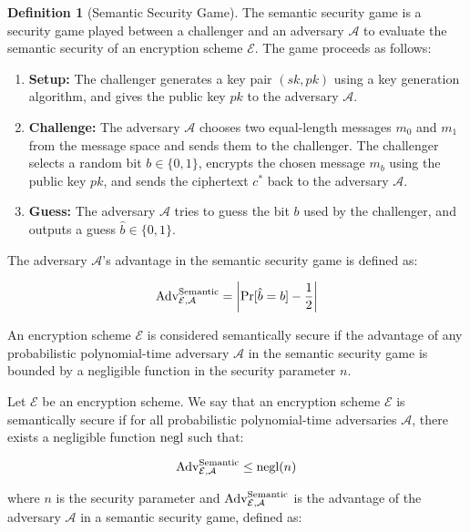\documentclass[12pt,openany]{book}
\theoremstyle{definition}
\newtheorem{definition}{Definition}[chapter]
\newcommand{\A}{\mathcal{A}}
\newcommand{\E}{\mathcal{E}}
\newcommand{\Adv}{\textnormal{Adv}}
\newcommand{\negl}{\textnormal{negl}}
\begin{document}
	\begin{definition}[Semantic Security Game]
		The semantic security game is a security game played between a challenger and an adversary $\A$ to evaluate the semantic security of an encryption scheme $\E$. The game proceeds as follows:
		
		\begin{enumerate}[label=\textbf{Stage \arabic*:}]
			\item \textbf{Setup:}
			The challenger generates a key pair $(sk, pk)$ using a key generation algorithm, and gives the public key $pk$ to the adversary $\A$.
			
			\item \textbf{Challenge:}
			The adversary $\A$ chooses two equal-length messages $m_0$ and $m_1$ from the message space and sends them to the challenger. The challenger selects a random bit $b \in \{0, 1\}$, encrypts the chosen message $m_b$ using the public key $pk$, and sends the ciphertext $c^*$ back to the adversary $\A$.
			
			\item \textbf{Guess:}
			The adversary $\A$ tries to guess the bit $b$ used by the challenger, and outputs a guess $\hat{b} \in \{0, 1\}$.
		\end{enumerate}
		
		The adversary $\A$'s advantage in the semantic security game is defined as:
		
		\begin{align*}
		\Adv_{\E, \A}^{\text{Semantic}} = \left| \Pr[\hat{b} = b] - \frac{1}{2} \right|
		\end{align*}
		
		An encryption scheme $\E$ is considered semantically secure if the advantage of any probabilistic polynomial-time adversary $\A$ in the semantic security game is bounded by a negligible function in the security parameter $n$.
	\end{definition}
	
	Let $\E$ be an encryption scheme. We say that an encryption scheme $\E$ is semantically secure if for all probabilistic polynomial-time adversaries $\A$, there exists a negligible function $\negl$ such that:
	
	\begin{align*}
	\Adv_{\E, \A}^{\text{Semantic}} \leq \negl(n)
	\end{align*}
	
	where $n$ is the security parameter and $\Adv_{\E, \A}^{\text{Semantic}}$ is the advantage of the adversary $\A$ in a semantic security game, defined as:
	
\end{document}

